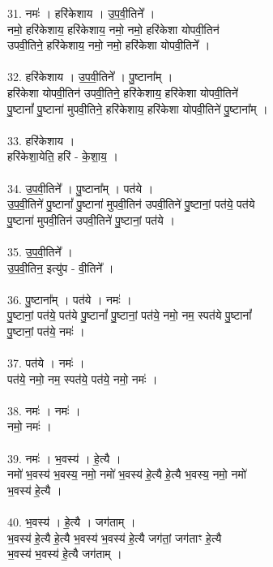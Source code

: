 31. नमः॑ । हरि॑केशाय । उ॒प॒वी॒तिने᳚ ।\\
नमो॒ हरि॑केशाय॒ हरि॑केशाय॒ नमो॒ नमो॒ हरि॑केशा योपवी॒तिन॑\\
उपवी॒तिने॒ हरि॑केशाय॒ नमो॒ नमो॒ हरि॑केशा योपवी॒तिने᳚ ।\\
\\
32. हरि॑केशाय । उ॒प॒वी॒तिने᳚ । पु॒ष्टाना᳚म् ।\\
हरि॑केशा योपवी॒तिन॑ उपवी॒तिने॒ हरि॑केशाय॒ हरि॑केशा योपवी॒तिने॑\\
पु॒ष्टानां᳚ पु॒ष्टाना॑ मुपवी॒तिने॒ हरि॑केशाय॒ हरि॑केशा योपवी॒तिने॑ पु॒ष्टाना᳚म् ।\\
\\
33. हरि॑केशाय ।\\
हरि॑केशा॒येति॒ हरि॑ - के॒शा॒य॒ ।\\
\\
34. उ॒प॒वी॒तिने᳚ । पु॒ष्टाना᳚म् । पत॑ये ।\\
उ॒प॒वी॒तिने॑ पु॒ष्टानां᳚ पु॒ष्टाना॑ मुपवी॒तिन॑ उपवी॒तिने॑ पु॒ष्टानां॒ पत॑ये॒ पत॑ये\\
पु॒ष्टाना॑ मुपवी॒तिन॑ उपवी॒तिने॑ पु॒ष्टानां॒ पत॑ये ।\\
\\
35. उ॒प॒वी॒तिने᳚ ।\\
उ॒प॒वी॒तिन॒ इत्यु॑प - वी॒तिने᳚ ।\\
\\
36. पु॒ष्टाना᳚म् । पत॑ये । नमः॑ ।\\
पु॒ष्टानां॒ पत॑ये॒ पत॑ये पु॒ष्टानां᳚ पु॒ष्टानां॒ पत॑ये॒ नमो॒ नम॒ स्पत॑ये पु॒ष्टानां᳚\\
पु॒ष्टानां॒ पत॑ये॒ नमः॑ ।\\
\\
37. पत॑ये । नमः॑ ।\\
पत॑ये॒ नमो॒ नम॒ स्पत॑ये॒ पत॑ये॒ नमो॒ नमः॑ ।\\
\\
38. नमः॑ । नमः॑ ।\\
नमो॒ नमः॑ ।\\
\\
39. नमः॑ । भ॒वस्य॑ । हे॒त्यै ।\\
नमो॑ भ॒वस्य॑ भ॒वस्य॒ नमो॒ नमो॑ भ॒वस्य॑ हे॒त्यै हे॒त्यै भ॒वस्य॒ नमो॒ नमो॑\\
भ॒वस्य॑ हे॒त्यै ।\\
\\
40. भ॒वस्य॑ । हे॒त्यै । जग॑ताम् ।\\
भ॒वस्य॑ हे॒त्यै हे॒त्यै भ॒वस्य॑ भ॒वस्य॑ हे॒त्यै जग॑तां॒ जग॑ताꣳ हे॒त्यै\\
भ॒वस्य॑ भ॒वस्य॑ हे॒त्यै जग॑ताम् ।\\
\\
